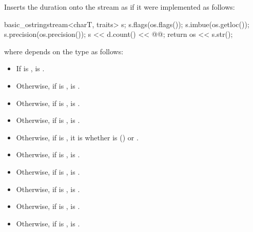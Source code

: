 \begin{itemdescr}
\pnum
\effects
Inserts the duration  onto the stream 
as if it were implemented as follows:
\begin{codeblock}
basic_ostringstream<charT, traits> s;
s.flags(os.flags());
s.imbue(os.getloc());
s.precision(os.precision());
s << d.count() << @@;
return os << s.str();
\end{codeblock}
where 
depends on the type  as follows:
\begin{itemize}
\item
If  is ,
 is .

\item
Otherwise, if  is ,
 is .

\item
Otherwise, if  is ,
 is .

\item
Otherwise, if  is ,
 is .

\item
Otherwise, if  is ,
it is
whether  is
 () or
.

\item
Otherwise, if  is ,
 is .

\item
Otherwise, if  is ,
 is .

\item
Otherwise, if  is ,
 is .

\item
Otherwise, if  is ,
 is .

\item
Otherwise, if  is ,
 is .


\end{itemize}
\end{itemdescr}
